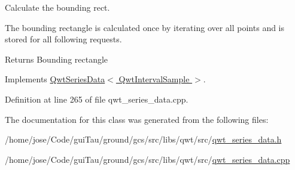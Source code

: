 Calculate the bounding rect. 

The bounding rectangle is calculated once by iterating over all points and is stored for all following requests.

\begin{DoxyReturn}{Returns}
Bounding rectangle 
\end{DoxyReturn}


Implements \hyperlink{class_qwt_series_data_aedb969ba51a27d88d26ad7f7cb1c2c7f}{Qwt\-Series\-Data$<$ Qwt\-Interval\-Sample $>$}.



Definition at line 265 of file qwt\-\_\-series\-\_\-data.\-cpp.



The documentation for this class was generated from the following files\-:\begin{DoxyCompactItemize}
\item 
/home/jose/\-Code/gui\-Tau/ground/gcs/src/libs/qwt/src/\hyperlink{qwt__series__data_8h}{qwt\-\_\-series\-\_\-data.\-h}\item 
/home/jose/\-Code/gui\-Tau/ground/gcs/src/libs/qwt/src/\hyperlink{qwt__series__data_8cpp}{qwt\-\_\-series\-\_\-data.\-cpp}\end{DoxyCompactItemize}
